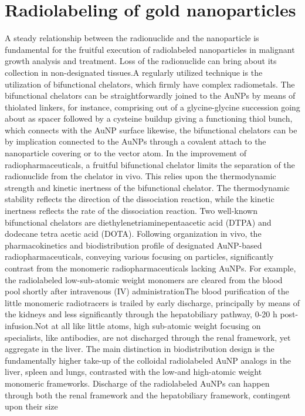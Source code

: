\documentclass{article}
\begin{document}
\section*{Radiolabeling of gold nanoparticles}
A steady relationship between the radionuclide and the nanoparticle is fundamental for the fruitful execution of radiolabeled nanoparticles in malignant growth analysis and treatment. Loss of the radionuclide can bring about its collection in non-designated tissues.A regularly utilized technique is the utilization of bifunctional chelators, which firmly have complex radiometals. The bifunctional chelators can be straightforwardly joined to the AuNPs by means of thiolated linkers, for instance, comprising out of a glycine-glycine succession going about as spacer followed by a cysteine buildup giving a functioning thiol bunch, which connects with the AuNP surface likewise, the bifunctional chelators can be by implication connected to the AuNPs through a covalent attach to the nanoparticle covering or to the vector atom. In the improvement of radiopharmaceuticals, a fruitful bifunctional chelator limits the separation of the radionuclide from the chelator in vivo. This relies upon the thermodynamic strength and kinetic inertness of the bifunctional chelator. The thermodynamic stability reflects the direction of the dissociation reaction, while the kinetic inertness reflects the rate of the dissociation reaction. Two well-known bifunctional chelators are diethylenetriaminepentaacetic acid (DTPA) and dodecane tetra acetic acid (DOTA).
\newline
Following organization in vivo, the pharmacokinetics and biodistribution profile of designated AuNP-based radiopharmaceuticals, conveying various focusing on particles, significantly contrast from the monomeric radiopharmaceuticals lacking AuNPs. For example, the radiolabeled low-sub-atomic weight monomers are cleared from the blood pool shortly after intravenous (IV) administrationThe blood purification of the little monomeric radiotracers is trailed by early discharge, principally by means of the kidneys and less significantly through the hepatobiliary pathway, 0-20 h post-infusion.Not at all like little atoms, high sub-atomic weight focusing on specialists, like antibodies, are not discharged through the renal framework, yet aggregate in the liver. The main distinction in biodistribution design is the fundamentally higher take-up of the colloidal radiolabeled AuNP analogs in the liver, spleen and lungs, contrasted with the low-and high-atomic weight monomeric frameworks. Discharge of the radiolabeled AuNPs can happen through both the renal framework and the hepatobiliary framework, contingent upon their size
\end{document}
